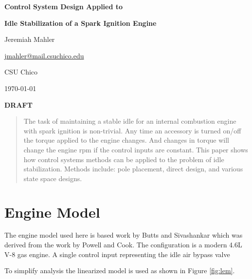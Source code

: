 \documentclass{article}
\begin{document}

\thispagestyle{empty}

\centerline{\Large \textbf{Control System Design Applied to}}
\centerline{\Large \textbf{Idle Stabilization of a Spark Ignition Engine}}
\vspace{0.1in}
\centerline{\normalsize {Jeremiah Mahler}}
\centerline{\small {\href{mailto:jmahler@mail.csuchico.edu}{jmahler@mail.csuchico.edu}} }
\vspace{0.1in}
\centerline{\normalsize {CSU Chico}}
\centerline{\small \today}
\vspace{0.2in}
\centerline{\LARGE \textbf{DRAFT}}
\vspace{0.2in}


\begin{abstract}
\noindent
The task of maintaining a stable idle for an internal combustion
engine with spark ignition is non-trivial.
Any time an accessory is turned on/off the torque applied to
the engine changes.
And changes in torque will change the engine rpm if the control
inputs are constant.
This paper shows how control systems methods can be applied to
the problem of idle stabilization.
Methods include: pole placement, direct design, and
various state space designs.

\end{abstract}

\section{Engine Model}

The engine model used here is based work
by Butts and Sivashankar\autocite{532315} which was derived from
the work by Powell and Cook\autocite{4789342}.
The configuration is a modern 4.6L V-8 gas engine.
A single control input representing the idle air bypass valve 

To simplify analysis the linearized model is used as shown in
Figure \ref{fig:lem}.
\end{document}
